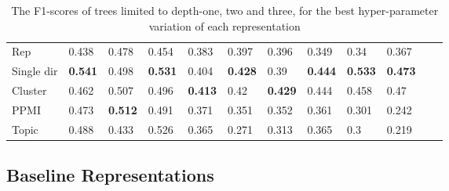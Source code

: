 {\begin{landscape}
\begin{table}[]
\begin{tabular}{llll@{\hskip 0.25in}lll@{\hskip 0.25in}lllll}
			\toprule[\heavyrulewidth]
			Rep               & 0.438                           & 0.478                           & 0.454                           & 0.383                           & 0.397                           & 0.396                           & 0.349                           & 0.34                            & 0.367                           &             &             \\
			Single dir        & \textbf{0.541} & 0.498                           & \textbf{0.531} & 0.404                           & \textbf{0.428} & 0.39                            & \textbf{0.444} & \textbf{0.533} & \textbf{0.473} &             &             \\
			Cluster           & 0.462                           & 0.507                           & 0.496                           & \textbf{0.413} & 0.42                            & \textbf{0.429} & 0.444                           & 0.458                           & 0.47                            &             &             \\
			PPMI              & 0.473                           & \textbf{0.512} & 0.491                           & 0.371                           & 0.351                           & 0.352                           & 0.361                           & 0.301                           & 0.242                           &             &             \\
			Topic             & 0.488                           & 0.433                           & 0.526                           & 0.365                           & 0.271                           & 0.313                           & 0.365                           & 0.3                             & 0.219                           &             &             \\   
		\end{tabular}
		\caption{The F1-scores of trees limited to depth-one, two and three, for the best hyper-parameter variation of each representation}
	\end{table}\label{bg:repsresults}
\end{landscape}
}
\subsection{Baseline Representations}

